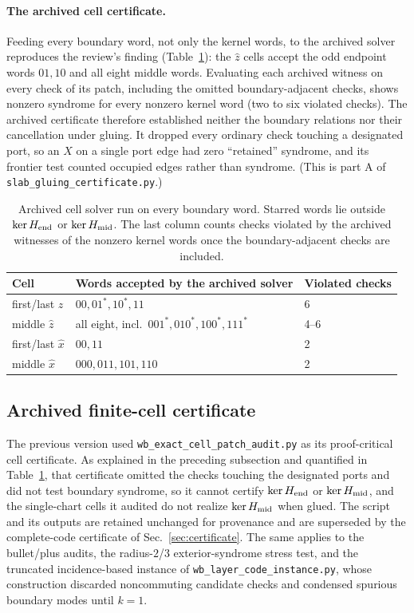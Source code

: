 \documentclass[aps,prx,reprint,superscriptaddress,nofootinbib,floatfix,longbibliography]{revtex4-2}
\theoremstyle{definition}
\begin{document}
\paragraph{The archived cell certificate.}
Feeding every boundary word, not only the kernel words, to the archived
solver reproduces the review's finding (Table~\ref{tab:old-cert}): the
$\hat z$ cells accept the odd endpoint words $01,10$ and all eight middle
words.  Evaluating each archived witness on every check of its patch,
including the omitted boundary-adjacent checks, shows nonzero syndrome for
every nonzero kernel word (two to six violated checks).  The archived certificate
therefore established neither the boundary relations nor their cancellation
under gluing.  It dropped every ordinary check touching a designated port, so
an $X$ on a single port edge had zero ``retained'' syndrome, and its frontier
test counted occupied edges rather than syndrome.  (This is part A of
\texttt{slab\_gluing\_certificate.py}.)

\begin{table}[t]
\caption{Archived cell solver run on every boundary word.  Starred words lie
outside $\ker H_{\rm end}$ or $\ker H_{\rm mid}$.  The last column counts
checks violated by the archived witnesses of the nonzero kernel words once the
boundary-adjacent checks are included.}
\label{tab:old-cert}
\centering
\scriptsize
\begin{tabular}{@{}lll@{}}
\toprule
Cell & Words accepted by the archived solver & Violated checks \\
\midrule
first/last $\hat z$ & $00,01^*,10^*,11$ & 6 \\
middle $\hat z$ & all eight, incl.\ $001^*,010^*,100^*,111^*$ & 4--6 \\
first/last $\hat x$ & $00,11$ & 2 \\
middle $\hat x$ & $000,011,101,110$ & 2 \\
\bottomrule
\end{tabular}
\end{table}

\subsection{Archived finite-cell certificate}\label{sec:finite-cell-cert}
\label{sec:junction-certificate}\label{sec:exact-cell-cert}
The previous version used \texttt{wb\_exact\_cell\_patch\_audit.py} as its
proof-critical cell certificate.  As explained in
the preceding subsection and quantified in Table~\ref{tab:old-cert}, that
certificate omitted the checks touching the designated ports and did not
test boundary syndrome, so it cannot certify $\ker H_{\rm end}$ or
$\ker H_{\rm mid}$, and the single-chart cells it audited do not realize
$\ker H_{\rm mid}$ when glued.  The script and its outputs are retained
unchanged for provenance and are superseded by the complete-code certificate
of Sec.~\ref{sec:certificate}.  The same applies to the bullet/plus audits,
the radius-$2$/$3$ exterior-syndrome stress test, and the truncated
incidence-based instance of \texttt{wb\_layer\_code\_instance.py}, whose
construction discarded noncommuting candidate checks and condensed spurious
boundary modes until $k=1$.
\end{document}
